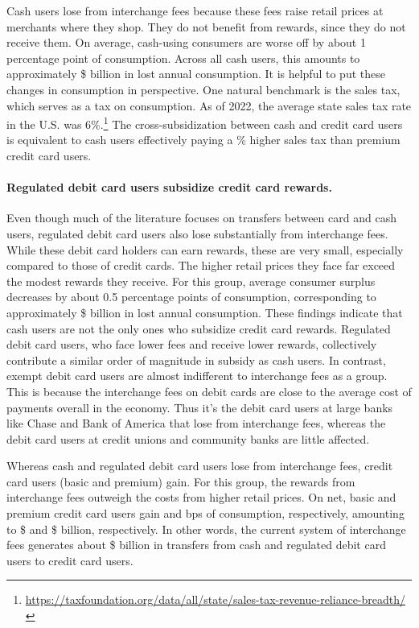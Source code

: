 \documentclass[main.tex]{subfiles}
\begin{document}
Cash users lose from interchange fees because these fees raise retail prices at merchants where they shop.
They do not benefit from rewards, since they do not receive them.
On average, cash-using consumers are worse off by about 1 percentage point of consumption.
Across all cash users, this amounts to approximately \$ billion in lost annual consumption.
It is helpful to put these changes in consumption in perspective.
One natural benchmark is the sales tax, which serves as a tax on consumption.
As of 2022, the average state sales tax rate in the U.S. was 6\%.\footnote{\url{https://taxfoundation.org/data/all/state/sales-tax-revenue-reliance-breadth/}} The cross-subsidization between cash and credit card users is equivalent to cash users effectively paying a \% higher sales tax than premium credit card users.

\paragraph{Regulated debit card users subsidize credit card rewards.}

Even though much of the literature focuses on transfers between card and cash users, regulated debit card users also lose substantially from interchange fees.
While these debit card holders can earn rewards, these are very small, especially compared to those of credit cards.
The higher retail prices they face far exceed the modest rewards they receive. For this group, average consumer surplus decreases by about 0.5 percentage points of consumption, corresponding to approximately \$ billion in lost annual consumption.
These findings indicate that cash users are not the only ones who subsidize credit card rewards.
Regulated debit card users, who face lower fees and receive lower rewards, collectively contribute a similar order of magnitude in subsidy as cash users.
In contrast, exempt debit card users are almost indifferent to interchange fees as a group.
This is because the interchange fees on debit cards are close to the average cost of payments overall in the economy.
Thus it's the debit card users at large banks like Chase and Bank of America that lose from interchange fees, whereas the debit card users at credit unions and community banks are little affected.

Whereas cash and regulated debit card users lose from interchange fees, credit card users (basic and premium) gain.
For this group, the rewards from interchange fees outweigh the costs from higher retail prices.
On net, basic and premium credit card users gain  and  bps of consumption, respectively, amounting to \$ and \$ billion, respectively.
In other words, the current system of interchange fees generates about \$ billion in transfers from cash and regulated debit card users to credit card users.
\end{document}
